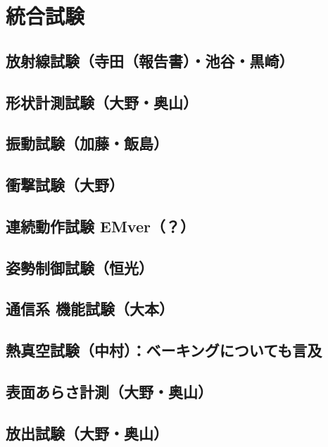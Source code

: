 \chapter{統合試験}
\label{chap:test}

%

\section{放射線試験（寺田（報告書）・池谷・黒崎）}

\section{形状計測試験（大野・奥山）}

\section{振動試験（加藤・飯島）}

\section{衝撃試験（大野）}

\section{連続動作試験 EMver（？）}

\section{姿勢制御試験（恒光）}

\section{通信系 機能試験（大本）}

\section{熱真空試験（中村）：ベーキングについても言及}

\section{表面あらさ計測（大野・奥山）}

\section{放出試験（大野・奥山）}